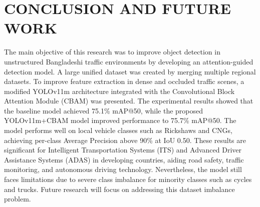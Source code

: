 \documentclass[sigconf]{acmart}
\begin{document}
\section{CONCLUSION AND FUTURE WORK}
The main objective of this research was to improve object detection in unstructured Bangladeshi traffic environments by developing an attention-guided detection model. A large unified dataset was created by merging multiple regional datasets. To improve feature extraction in dense and occluded traffic scenes, a modified YOLOv11m architecture integrated with the Convolutional Block Attention Module (CBAM) was presented. The experimental results showed that the baseline model achieved 75.1\% mAP@50, while the proposed YOLOv11m+CBAM model improved performance to 75.7\% mAP@50. The model performs well on local vehicle classes such as Rickshaws and CNGs, achieving per-class Average Precision above 90\% at IoU 0.50. These results are significant for Intelligent Transportation Systems (ITS) and Advanced Driver Assistance Systems (ADAS) in developing countries, aiding road safety, traffic monitoring, and autonomous driving technology. Nevertheless, the model still faces limitations due to severe class imbalance for minority classes such as cycles and trucks. Future research will focus on addressing this dataset imbalance problem.



\end{document}
